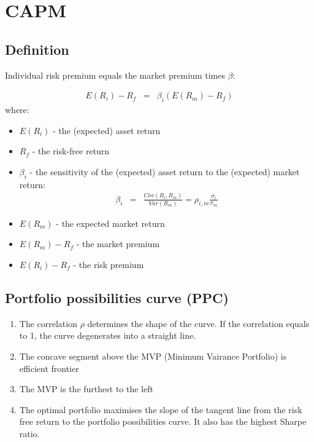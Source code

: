 \chapter{CAPM}

\section{Definition}

Individual risk premium equals the market premium times $\beta$:

\begin{eqnarray}
E(R_{i}) - R_{f} &=& \beta_{i}(E(R_{m}) - R_{f})
\end{eqnarray}
where:
\begin{itemize}
	\item $E(R_{i})$ - the (expected) asset return
	\item $R_{f}$ - the risk-free return
	\item $\beta_{i}$ - the sensitivity of the (expected) asset return to the (expected) market return:
	\begin{eqnarray}
	\beta_{i} &=& \frac{Cov(R_{i}, R_{m})}{Var(R_{m})} = \rho_{i, m} \frac{\sigma_{i}}{\sigma_{m}}
	\end{eqnarray}
	\item $E(R_{m})$ - the expected market return
	\item $E(R_{m}) - R_{f}$ - the market premium
	\item $E(R_{i}) - R_{f}$ - the risk premium
\end{itemize}

\section{Portfolio possibilities curve (PPC)}
\begin{enumerate}
	\item The correlation $\rho$ determines the shape of the curve. If the correlation equals to 1, the curve degenerates into a straight line.
	\item The concave segment above the MVP (Minimum Vairance Portfolio) is efficient frontier
	\item The MVP is the furthest to the left
	\item The optimal portfolio maximises the slope of the tangent line from the risk free return to the portfolio possibilities curve. It also has the highest Sharpe ratio.
\end{enumerate}


